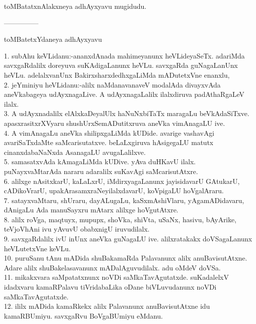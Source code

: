 \documentclass{article}
\begin{document}
\begin{center}
toMBatatxnAlakxneya adhAyxyavu mugidudu.
\end{center}

\begin{center}
---------------
\end{center}

\begin{center}
toMBatetxYdaneya adhAyxyavu
\end{center}

1. subAhu keVLidanu:-ananxdAnada mahimeyanunx heVLideyaSeTx. adariMda savxgaRdalilx doreyuva suKAdigaLanunx heVLu. savxgaRda guNagaLanUnx heVLu. adelalxvanUnx BakirxsharxdedhxgaLiMda mADutetxVne enanxlu,\\
2. jeYminiyu heVLidanu:-alilx naMdanavanaveV modalAda divayxvAda aneVkabageya udAyxnagaLive. A udAyxnagaLalilx ilalxdiruva padAthaRgaLeV ilalx.\\
3. A udAyxnadalilx elAlxkaDeyalUlx haNuNxbiTaTx maragaLu beVkAdaSiTxve. apasxrasitxrXVyaru shushUrxSemADutitxruva aneVka vimAnagaLU ive.\\
4. A vimAnagaLu aneVka shilipxgaLiMda kUDide. avarige vashavAgi avariSaTxdaMte saMcarisutatxve. beLaLxgiruva hAsigegaLU matutx cinanxdabaNaNxda AsanagaLU avugaLalilxve.\\
5. samasatxvAda kAmagaLiMda kUDive. yAva duHKavU ilalx. puNayxvaMtarAda nararu adaralilx suKavAgi saMcarisutAtxre.\\
6. alilxge nAsitxkarU, kaLaLxrU, iMdirxyagaLanunx jayisidavarU GAtukarU, cADikoVrarU, upakArasamxraNeyilalxdavarU, koVpigaLU hoVgalAraru.\\
7. satayxvaMtaru, shUraru, dayALugaLu, kaSxmAshiVlaru, yAgamADidavaru, dAnigaLu Ada manuSayxru mAtarx alilxge hoVgutAtxre.\\
8. alilx roVga, maqtuyx, mupupx, shoVka, shiVta, uSaNx, hasivu, bAyArike, teVjoVhAni ivu yAvuvU obabxnigU iruvudilalx.\\
9. savxgaRdalilx ivU inUnx aneVka guNagaLU ive. alilxratakakx doVSagaLanunx heVLutetxVne keVLu.\\
10. puruSanu tAnu mADida shuBakamaRda Palavanunx alilx anuBavisutAtxne. Adare alilx shuBakelasavanunx mADalAguvudilalx. adu oMdeV doVSa.\\
11. mikakxvara saMpatatxnunx noVDi saMkaTavAgutatxde. suKadalelxV idadxvaru kamaRPalavu tiVridabaLika oDane biVLuvudanunx noVDi saMkaTavAgutatxde.\\
12. ililx mADida kamaRkekx alilx Palavanunx anuBavisutAtxne idu kamaRBUmiyu. savxgaRvu BoVgaBUmiyu eMdanu.\\
\end{document}
